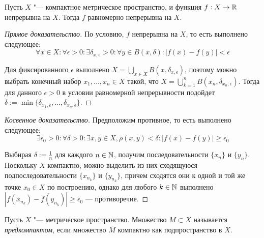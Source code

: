 \begin{theorem}[Кантора]\label{thm3.3}
    Пусть $X$ "--- компактное метрическое пространство, и функция $f: X \to \mathbb{R}$ непрерывна на $X$. Тогда $f$ равномерно непрерывна на $X$.
\end{theorem}

\begin{proof}[Прямое доказательство]
    По условию, $f$ непрерывна на $X$, то есть выполнено следующее:
    \[\forall x \in X: \forall \epsilon > 0: \exists \delta_{x, \epsilon} > 0: \forall y \in B(x, \delta): |f(x) - f(y)| < \epsilon\]

    Для фиксированного $\epsilon$ выполнено $X = \bigcup_{x \in X}B(x, \delta_{x, \epsilon})$, поэтому можно выбрать конечный набор $x_1, \dotsc, x_n \in X$ такой, что $X = \bigcup_{k = 1}^nB(x_n, \delta_{x_n, \epsilon})$. Тогда для данного $\epsilon > 0$ в условии равномерной непрерывности подойдет $\delta := \min\{\delta_{x_1, \epsilon}, \dotsc, \delta_{x_n, \epsilon}\}$.
\end{proof}

\begin{proof}[Косвенное доказательство]
    Предположим противное, то есть выполнено следующее:
    \[\exists \epsilon_0 > 0: \forall \delta > 0: \exists x, y \in X, \rho(x, y) < \delta: |f(x) - f(y)| \ge \epsilon_0\]

    Выбирая $\delta := \frac 1n$ для каждого $n \in \mathbb{N}$, получим последовательности $\{x_n\}$ и $\{y_n\}$. Поскольку $X$ компактно, можно выделить из них сходящуюся подпоследовательности $\{x_{n_k}\}$ и $\{y_{n_k}\}$, причем сходятся они к одной и той же точке $x_0 \in X$ по построению, однако для любого $k \in \mathbb{N}$ выполнено $|f(x_{n_k}) - f(y_{n_k})| \ge \epsilon_0$ --- противоречие.
\end{proof}

\begin{definition}
    Пусть $X$ "--- метрическое пространство. Множество $M \subset X$ называется \textit{предкомпактом}, если множество $\overline M$ компактно как подпространство в $X$.
\end{definition}

